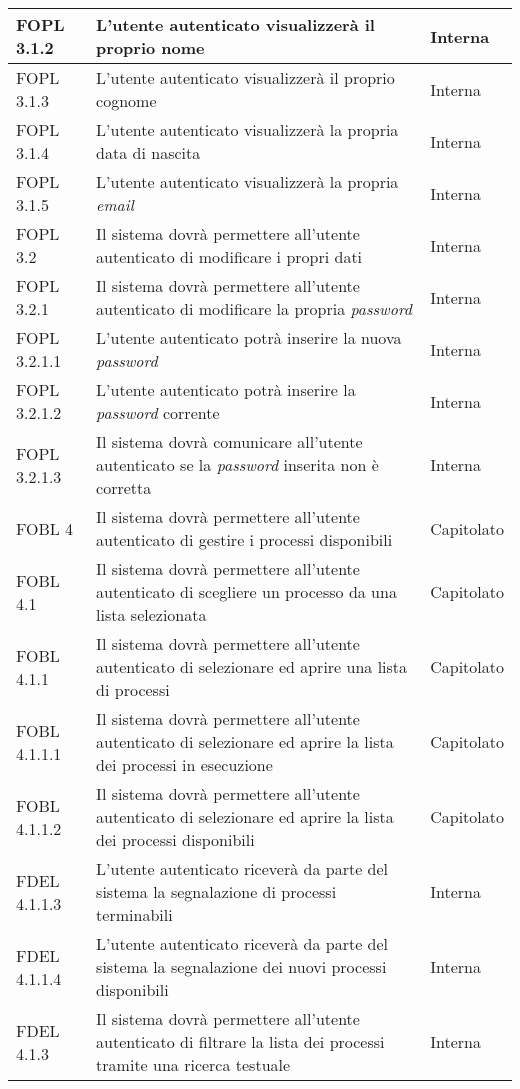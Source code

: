 \begin{longtable}{lXp{}}
\midrule
FOPL 3.1.2&L'utente autenticato visualizzerà il proprio nome&Interna\\
\midrule
FOPL 3.1.3&L'utente autenticato visualizzerà il proprio cognome&Interna\\
\midrule
FOPL 3.1.4&L'utente autenticato visualizzerà la propria data di nascita&Interna\\
\midrule
FOPL 3.1.5&L'utente autenticato visualizzerà la propria \textit{email}&Interna\\
\midrule
FOPL 3.2&Il sistema dovrà permettere all'utente autenticato di modificare i propri dati&Interna\\
\midrule
FOPL 3.2.1&Il sistema dovrà permettere all'utente autenticato di modificare la propria \textit{password}&Interna\\
\midrule
FOPL 3.2.1.1&L'utente autenticato potrà inserire la nuova \textit{password}&Interna\\
\midrule
FOPL 3.2.1.2&L'utente autenticato potrà inserire la \textit{password} corrente&Interna\\
\midrule
FOPL 3.2.1.3&Il sistema dovrà comunicare all'utente autenticato se la \textit{password} inserita non è corretta&Interna\\
\midrule
FOBL 4&Il sistema dovrà permettere all'utente autenticato di gestire i processi disponibili&Capitolato\\
\midrule
FOBL 4.1&Il sistema dovrà permettere all'utente autenticato di scegliere un processo da una lista selezionata&Capitolato\\
\midrule
FOBL 4.1.1&Il sistema dovrà permettere all'utente autenticato di selezionare ed aprire una lista di processi&Capitolato\\
\midrule
FOBL 4.1.1.1&Il sistema dovrà permettere all'utente autenticato di selezionare ed aprire la lista dei processi in esecuzione&Capitolato\\
\midrule
FOBL 4.1.1.2&Il sistema dovrà permettere all'utente autenticato di selezionare ed aprire la lista dei processi disponibili&Capitolato\\
\midrule
FDEL 4.1.1.3&L'utente autenticato riceverà da parte del sistema la segnalazione di processi terminabili&Interna\\
\midrule
FDEL 4.1.1.4&L'utente autenticato riceverà da parte del sistema la segnalazione dei nuovi processi disponibili&Interna\\
\midrule
FDEL 4.1.3&Il sistema dovrà permettere all'utente autenticato di filtrare la lista dei processi tramite una ricerca testuale&Interna\\

\end{longtable}
